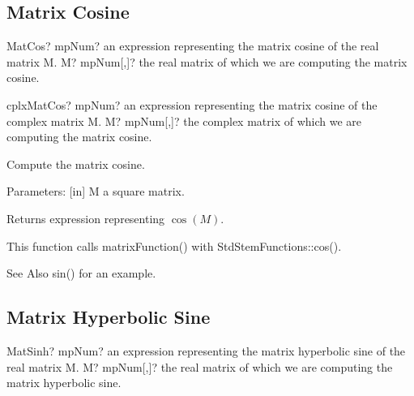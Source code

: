 \newpage
\subsection{Matrix Cosine}


\begin{mpFunctionsExtract}
	\mpFunctionOne
	{MatCos? mpNum? an expression representing the matrix cosine of the real matrix M.}
	{M? mpNum[,]? the real matrix of which we are computing the matrix cosine.}
\end{mpFunctionsExtract}

\vspace{0.6cm}
\begin{mpFunctionsExtract}
	\mpFunctionOne
	{cplxMatCos? mpNum? an expression representing the matrix cosine of the complex matrix M.}
	{M? mpNum[,]? the complex matrix of which we are computing the matrix cosine.}
\end{mpFunctionsExtract}

%

\vspace{0.3cm}
Compute the matrix cosine.

Parameters: [in] M a square matrix.  

Returns expression representing $\cos(M)$.

This function calls matrixFunction() with StdStemFunctions::cos().

See Also sin() for an example.



\subsection{Matrix Hyperbolic Sine}


\begin{mpFunctionsExtract}
	\mpFunctionOne
	{MatSinh? mpNum? an expression representing the matrix hyperbolic sine of the real matrix M.}
	{M? mpNum[,]? the real matrix of which we are computing the matrix hyperbolic sine.}
\end{mpFunctionsExtract}

